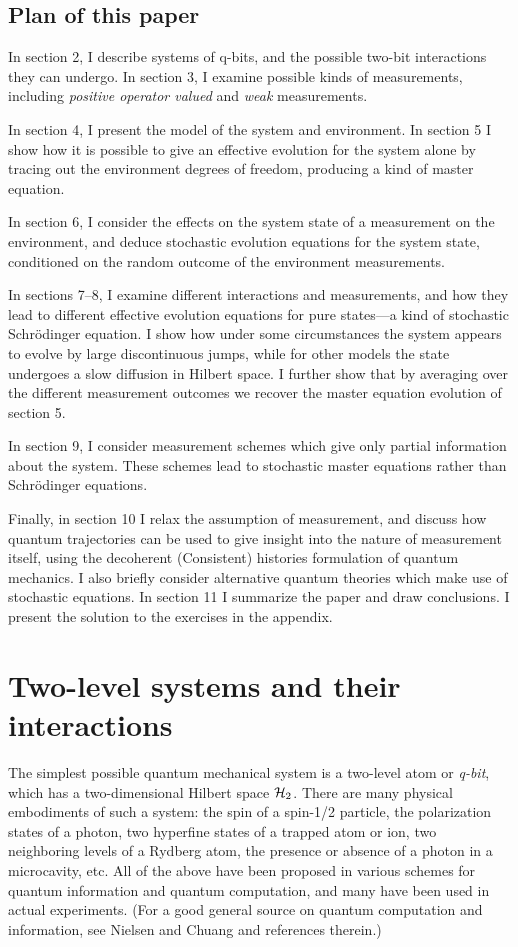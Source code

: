 \documentclass[12pt]{article}
\begin{document}
\subsection{Plan of this paper}

In section 2, I describe systems of q-bits, and the possible
two-bit interactions they can undergo.  In section 3, I examine possible
kinds of measurements, including {\it positive operator valued} and
{\it weak} measurements.

In section 4, I present the model of the system and environment.  In
section 5 I show how it is possible to give an effective evolution
for the system alone by tracing out the environment degrees of freedom,
producing a kind of master equation.

In section 6, I consider the effects on the system state of a measurement on
the environment, and deduce stochastic evolution equations for the system
state, conditioned on the random outcome of the environment measurements.

In sections 7--8, I examine different interactions and measurements,
and how they lead to different effective evolution equations for pure
states---a kind of stochastic Schr\"odinger equation.
I show how under some circumstances the system appears to evolve by
large discontinuous jumps, while for other models the state undergoes
a slow diffusion in Hilbert space.  I further show that by averaging over
the different measurement outcomes we recover the master equation evolution
of section 5.

In section 9, I consider measurement schemes which give only partial
information about the system.  These schemes lead to stochastic master
equations rather than Schr\"odinger equations.

Finally, in section 10 I relax the assumption of measurement, and discuss
how quantum trajectories can be used to give insight into the nature of
measurement itself, using the decoherent (Consistent) histories formulation
of quantum mechanics.  I also briefly consider alternative quantum theories
which make use of stochastic equations.  In section 11 I summarize the paper
and draw conclusions.  I present the solution to the exercises in the
appendix.

\section{Two-level systems and their interactions}

The simplest possible quantum mechanical system is a two-level atom or
{\it q-bit}, which has a two-dimensional Hilbert space ${\cal H}_2$.
There are many physical embodiments of such a system:  the spin of a
spin-1/2 particle, the polarization states of a photon, two hyperfine
states of a trapped atom or ion, two neighboring levels of a Rydberg atom,
the presence or absence of a photon in a microcavity, etc.  All of the
above have been proposed in various schemes for quantum information and
quantum computation, and many have been used in actual
experiments.  (For a good general source on quantum computation and
information, see Nielsen and Chuang \cite{NielsenChuang} and
references therein.)
\end{document}
